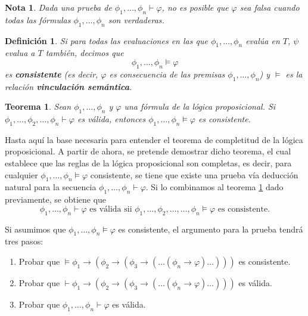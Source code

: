 \documentclass[18pt]{article}
\newtheorem{teor}{Teorema}
\newtheorem{Def}{Definición}
\newtheorem{nota}{Nota}
\begin{document}
\begin{nota}
Dada una prueba de $\phi_1,\dots, \phi_n \vdash  \varphi $, no es posible que $\varphi$ sea falsa cuando todas las fórmulas $\phi_1,\dots, \phi_n$ son verdaderas. 
\end{nota}

\begin{Def}
  Si para todas las evaluaciones en las que $\phi_1,\dots, \phi_n$ evalúa en $T$, $\psi$ evalua a $T$ también, decimos que
  $$\phi_1,\dots, \phi_n \models \varphi $$
  es \textbf{consistente} (es decir, $\varphi$ es consecuencia de las premisas $\phi_1,\dots,\phi_n$) y $ \models $ es la relación \textbf{vinculación semántica}. 
\end{Def}

\begin{teor} \label{soundness}
Sean $\phi_1,\dots, \phi_n$ y $\varphi$ una fórmula de la lógica proposicional. Si $\phi_1,\dots, \phi_2,\dots, \phi_n \vdash \varphi$ es válida, entonces $\phi_1,\dots,\phi_n \models \varphi$ es consistente. 
\end{teor}

Hasta aquí la base necesaria para entender el teorema de completitud de la lógica proposicional. A partir de ahora, se pretende demostrar dicho teorema, el cual establece que las reglas de la lógica proposicional son completas, es decir, para cualquier $\phi_1,\dots , \phi_n \models \varphi$ consistente, se tiene que existe una prueba vía deducción natural para la secuencia $\phi_1,\dots, \phi_n\vdash \varphi$.  Si lo combinamos al teorema \ref{soundness} dado previamente, se obtiene que
$$\phi_1,\dots, \phi_n \vdash \varphi \text{ es válida sii } \phi_1,\dots, \phi_2,\dots, \dots, \phi_n \models \varphi \text{ es consistente}. $$

Si asumimos que $\phi_1,\dots, \phi_n \models \varphi$ es consistente, el argumento para la prueba tendrá tres pasos:

\begin{enumerate}
\item Probar que $\models \phi_1 \rightarrow (\phi_2 \rightarrow (\phi_3 \rightarrow ( \dots (\phi_n \rightarrow \varphi)\dots )))$ es consistente.
\item Probar que $\vdash \phi_1 \rightarrow (\phi_2 \rightarrow (\phi_3 \rightarrow (\dots (\phi_n \rightarrow \varphi )\dots )))$ es válida.
\item Probar que $\phi_1,\dots, \phi_n\vdash \varphi$ es válida. 
\end{enumerate}
\end{document}
